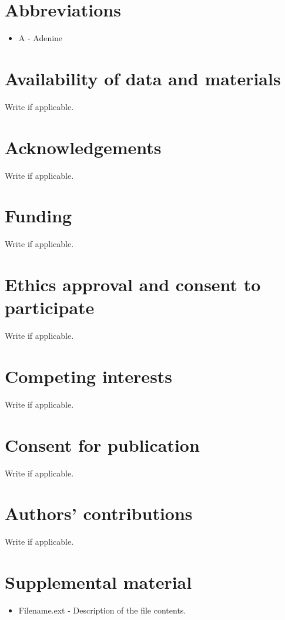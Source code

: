 \documentclass{article}
\begin{document}
\begin{backmatter}

\section*{Abbreviations}
\begin{itemize}
    \item A - Adenine
\end{itemize}
    
\section*{Availability of data and materials}
Write if applicable.

\section*{Acknowledgements}
Write if applicable.

\section*{Funding}
Write if applicable.

\section*{Ethics approval and consent to participate}
Write if applicable.

\section*{Competing interests}
Write if applicable.

\section*{Consent for publication}
Write if applicable.
    
\section*{Authors' contributions}
Write if applicable.

\section*{Supplemental material}
\begin{itemize}
    \item Filename.ext - Description of the file contents.
\end{itemize}

\end{backmatter}
\end{document}
